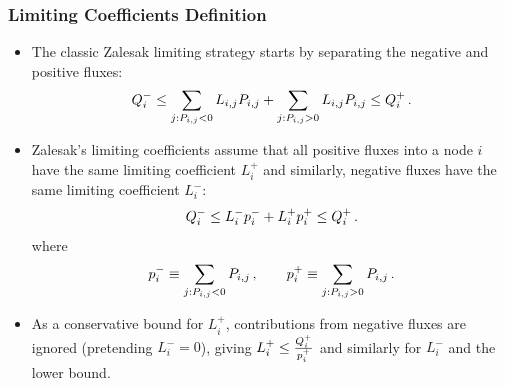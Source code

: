 \begin{frame}
\frametitle{Limiting Coefficients Definition}

\begin{itemize}
   \item The classic Zalesak limiting strategy starts by separating the
      negative and positive fluxes:
      \begin{equation}
         Q^-_i \leq \sum\limits_{j:\correctionfluxij<0} L\ij \correctionfluxij +
            \sum\limits_{j:\correctionfluxij>0} L\ij \correctionfluxij\leq Q^+_i \eqp
      \end{equation}
   \item Zalesak's limiting coefficients assume that
      all positive fluxes into a node $i$ have the same limiting coefficient
      $L^+_i$ and similarly, negative fluxes have the same limiting coefficient
      $L^-_i$:
      \begin{equation}
        Q^-_i \leq L^-_i p^-_i
          + L^+_i p^+_i \leq Q^+_i \,.
      \end{equation}
      where
      \begin{equation}
        \correctionfluxletter_i^- \equiv \sum\limits_{j:\correctionfluxij<0}
          \correctionfluxij \eqc \qquad
        \correctionfluxletter_i^+ \equiv \sum\limits_{j:\correctionfluxij>0}
          \correctionfluxij \eqp
      \end{equation}
   \item As a conservative bound for $L^+_i$, contributions from negative fluxes
      are ignored (pretending $L_i^-=0$), giving
      $L^+_i \leq \frac{Q_i^+}{p_i^+}$
      and similarly for $L^-_i$ and the lower bound.
\end{itemize}

\end{frame}
